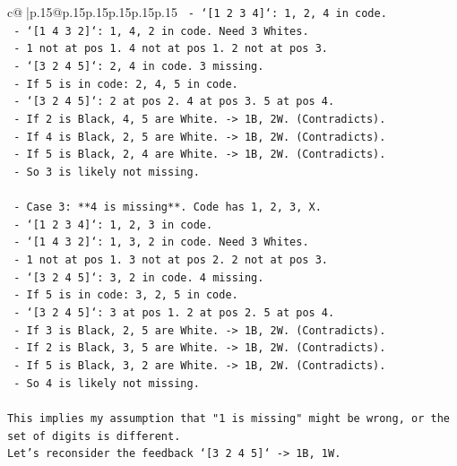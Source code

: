 \documentclass{article}
\begin{document}
{\begin{supertabular}{c@{$\;$}|p{.15\linewidth}@{}p{.15\linewidth}p{.15\linewidth}p{.15\linewidth}p{.15\linewidth}p{.15\linewidth}}
{{{\texttt{      {-} `{[}1 2 3 4{]}`: 1, 2, 4 in code.} \\
\texttt{      {-} `{[}1 4 3 2{]}`: 1, 4, 2 in code. Need 3 Whites.} \\
\texttt{        {-} 1 not at pos 1. 4 not at pos 1. 2 not at pos 3.} \\
\texttt{      {-} `{[}3 2 4 5{]}`: 2, 4 in code. 3 missing.} \\
\texttt{        {-} If 5 is in code: 2, 4, 5 in code.} \\
\texttt{        {-} `{[}3 2 4 5{]}`: 2 at pos 2. 4 at pos 3. 5 at pos 4.} \\
\texttt{        {-} If 2 is Black, 4, 5 are White. {-}> 1B, 2W. (Contradicts).} \\
\texttt{        {-} If 4 is Black, 2, 5 are White. {-}> 1B, 2W. (Contradicts).} \\
\texttt{        {-} If 5 is Black, 2, 4 are White. {-}> 1B, 2W. (Contradicts).} \\
\texttt{      {-} So 3 is likely not missing.} \\
\\ 
\texttt{    {-} Case 3: **4 is missing**. Code has 1, 2, 3, X.} \\
\texttt{      {-} `{[}1 2 3 4{]}`: 1, 2, 3 in code.} \\
\texttt{      {-} `{[}1 4 3 2{]}`: 1, 3, 2 in code. Need 3 Whites.} \\
\texttt{        {-} 1 not at pos 1. 3 not at pos 2. 2 not at pos 3.} \\
\texttt{      {-} `{[}3 2 4 5{]}`: 3, 2 in code. 4 missing.} \\
\texttt{        {-} If 5 is in code: 3, 2, 5 in code.} \\
\texttt{        {-} `{[}3 2 4 5{]}`: 3 at pos 1. 2 at pos 2. 5 at pos 4.} \\
\texttt{        {-} If 3 is Black, 2, 5 are White. {-}> 1B, 2W. (Contradicts).} \\
\texttt{        {-} If 2 is Black, 3, 5 are White. {-}> 1B, 2W. (Contradicts).} \\
\texttt{        {-} If 5 is Black, 3, 2 are White. {-}> 1B, 2W. (Contradicts).} \\
\texttt{      {-} So 4 is likely not missing.} \\
\\ 
\texttt{This implies my assumption that "1 is missing" might be wrong, or the set of digits is different.} \\
\texttt{Let's reconsider the feedback `{[}3 2 4 5{]}` {-}> 1B, 1W.} \\
}}}
\end{supertabular}}
\end{document}
